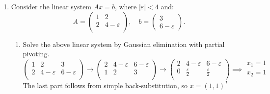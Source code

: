 \documentclass[11pt]{article}
\newcommand{\n}{\vspace{0.3cm}}
\begin{document}
\begin{enumerate}
	\item Consider the linear system \(Ax = b\), where \(|\varepsilon| < 4\) and:
	      \[
		      A = \left(\begin{array}{cc} 1 & 2 \\ 2 & 4-\varepsilon \\ \end{array}\right), \quad
		      b = \left(\begin{array}{c} 3 \\ 6-\varepsilon \end{array}\right).
	      \]
	      \begin{enumerate}
		      \item Solve the above linear system by Gaussian elimination with partial pivoting.
		            \[
			            \left(\begin{array}{rr|r}
					            1 & 2             & 3             \\
					            2 & 4-\varepsilon & 6-\varepsilon \\
				            \end{array}\right)
			            \to
			            \left(\begin{array}{rr|r}
					            2 & 4-\varepsilon & 6-\varepsilon \\
					            1 & 2             & 3             \\
				            \end{array}\right)
			            \to
			            \left(\begin{array}{rr|r}
					            2 & 4-\varepsilon      & 6-\varepsilon      \\
					            0 & \tfrac\varepsilon2 & \tfrac\varepsilon2 \\
				            \end{array}\right)
			            \implies
			            \begin{array}{c}
				            x_1 = 1 \\
				            x_2 = 1 \\
			            \end{array}
		            \]
		            The last part follows from simple back-substitution, so \(x = (1,1)^T\) \n


\end{enumerate}
\end{enumerate}
\end{document}
